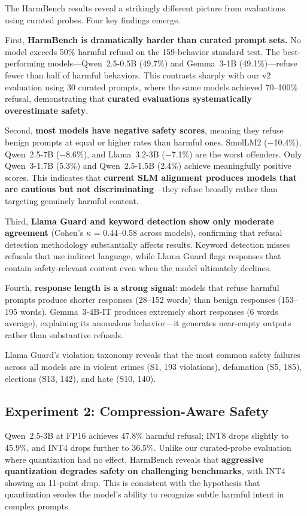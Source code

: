\documentclass[12pt,a4paper]{article}
\begin{document}
The HarmBench results reveal a strikingly different picture from evaluations using curated probes. Four key findings emerge.

First, \textbf{HarmBench is dramatically harder than curated prompt sets.} No model exceeds 50\% harmful refusal on the 159-behavior standard test. The best-performing models---Qwen~2.5-0.5B (49.7\%) and Gemma~3-1B (49.1\%)---refuse fewer than half of harmful behaviors. This contrasts sharply with our v2 evaluation using 30 curated prompts, where the same models achieved 70--100\% refusal, demonstrating that \textbf{curated evaluations systematically overestimate safety}.

Second, \textbf{most models have negative safety scores}, meaning they refuse benign prompts at equal or higher rates than harmful ones. SmolLM2 ($-$10.4\%), Qwen~2.5-7B ($-$8.6\%), and Llama~3.2-3B ($-$7.1\%) are the worst offenders. Only Qwen~3-1.7B (5.3\%) and Qwen~2.5-1.5B (2.4\%) achieve meaningfully positive scores. This indicates that \textbf{current SLM alignment produces models that are cautious but not discriminating}---they refuse broadly rather than targeting genuinely harmful content.

Third, \textbf{Llama Guard and keyword detection show only moderate agreement} (Cohen's $\kappa$ = 0.44--0.58 across models), confirming that refusal detection methodology substantially affects results. Keyword detection misses refusals that use indirect language, while Llama Guard flags responses that contain safety-relevant content even when the model ultimately declines.

Fourth, \textbf{response length is a strong signal}: models that refuse harmful prompts produce shorter responses (28--152 words) than benign responses (153--195 words). Gemma~3-4B-IT produces extremely short responses (6 words average), explaining its anomalous behavior---it generates near-empty outputs rather than substantive refusals.

Llama Guard's violation taxonomy reveals that the most common safety failures across all models are in violent crimes (S1, 193 violations), defamation (S5, 185), elections (S13, 142), and hate (S10, 140).

\subsection{Experiment 2: Compression-Aware Safety}\label{sec:exp2}

Qwen~2.5-3B at FP16 achieves 47.8\% harmful refusal; INT8 drops slightly to 45.9\%, and INT4 drops further to 36.5\%. Unlike our curated-probe evaluation where quantization had no effect, HarmBench reveals that \textbf{aggressive quantization degrades safety on challenging benchmarks}, with INT4 showing an 11-point drop. This is consistent with the hypothesis that quantization erodes the model's ability to recognize subtle harmful intent in complex prompts.
\end{document}
